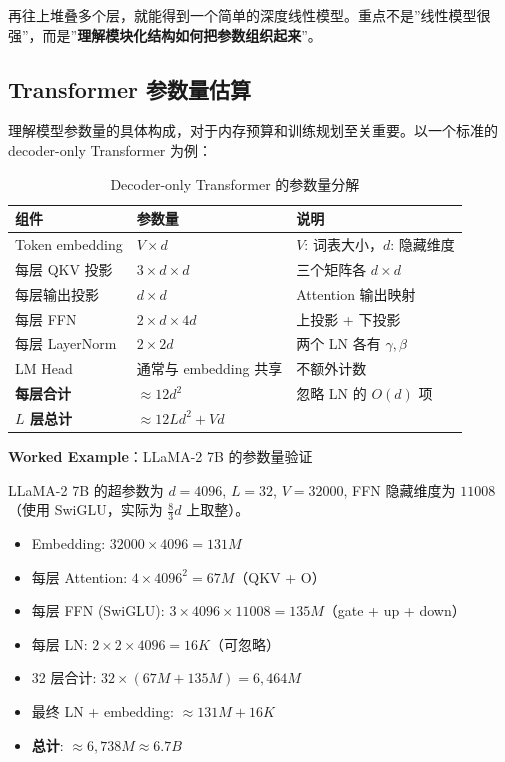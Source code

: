 \documentclass[a4paper]{article}
\begin{document}
再往上堆叠多个层，就能得到一个简单的深度线性模型。重点不是”线性模型很强”，而是”\textbf{理解模块化结构如何把参数组织起来}”。

\subsection{Transformer 参数量估算}

理解模型参数量的具体构成，对于内存预算和训练规划至关重要。以一个标准的 decoder-only Transformer 为例：

\begin{table}[H]
\centering
\begin{tabular}{p{}p{}p{}}
\toprule
\textbf{组件} & \textbf{参数量} & \textbf{说明} \\
\midrule
Token embedding & $V \times d$ & $V$: 词表大小，$d$: 隐藏维度 \\
每层 QKV 投影 & $3 \times d \times d$ & 三个矩阵各 $d \times d$ \\
每层输出投影 & $d \times d$ & Attention 输出映射 \\
每层 FFN & $2 \times d \times 4d$ & 上投影 + 下投影 \\
每层 LayerNorm & $2 \times 2d$ & 两个 LN 各有 $\gamma, \beta$ \\
LM Head & 通常与 embedding 共享 & 不额外计数 \\
\midrule
\textbf{每层合计} & $\approx 12d^2$ & 忽略 LN 的 $O(d)$ 项 \\
\textbf{$L$ 层总计} & $\approx 12Ld^2 + Vd$ & \\
\bottomrule
\end{tabular}
\caption{Decoder-only Transformer 的参数量分解}
\end{table}

\textbf{Worked Example}：LLaMA-2 7B 的参数量验证

LLaMA-2 7B 的超参数为 $d = 4096$, $L = 32$, $V = 32000$, FFN 隐藏维度为 $11008$（使用 SwiGLU，实际为 $\frac{8}{3}d$ 上取整）。

\begin{itemize}
    \item Embedding: $32000 \times 4096 = 131M$
    \item 每层 Attention: $4 \times 4096^2 = 67M$（QKV + O）
    \item 每层 FFN (SwiGLU): $3 \times 4096 \times 11008 = 135M$（gate + up + down）
    \item 每层 LN: $2 \times 2 \times 4096 = 16K$（可忽略）
    \item 32 层合计: $32 \times (67M + 135M) = 6,464M$
    \item 最终 LN + embedding: $\approx 131M + 16K$
    \item \textbf{总计}: $\approx 6,738M \approx 6.7B$
\end{itemize}
\end{document}
